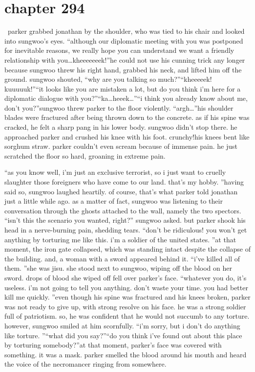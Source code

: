 \section{chapter 294}






 parker grabbed jonathan by the shoulder, who was tied to his chair and looked into sungwoo’s eyes.
“although our diplomatic meeting with you was postponed for inevitable reasons, we really hope you can understand we want a friendly relationship with you…kheeeeeeek!”he could not use his cunning trick any longer because sungwoo threw his right hand, grabbed his neck, and lifted him off the ground.
sungwoo shouted, “why are you talking so much?”“kheeeeek! kuuuuuk!”“it looks like you are mistaken a lot, but do you think i’m here for a diplomatic dialogue with you?”“ka…heeek…”“i think you already know about me, don’t you?”sungwoo threw parker to the floor violently.
“argh…”his shoulder blades were fractured after being thrown down to the concrete.
 as if his spine was cracked, he felt a sharp pang in his lower body.
sungwoo didn’t stop there.
 he approached parker and crushed his knee with his foot.
crunchy!his knees bent like sorghum straw.
 parker couldn’t even scream because of immense pain.
he just scratched the floor so hard, groaning in extreme pain.

“as you know well, i’m just an exclusive terrorist, so i just want to cruelly slaughter those foreigners who have come to our land.
 that’s my hobby.
”having said so, sungwoo laughed heartily.
 of course, that’s what parker told jonathan just a little while ago.
as a matter of fact, sungwoo was listening to their conversation through the ghosts attached to the wall, namely the two spectors.
“isn’t this the scenario you wanted, right?” sungwoo asked.
but parker shook his head in a nerve-burning pain, shedding tears.
“don’t be ridiculous! you won’t get anything by torturing me like this.
 i’m a soldier of the united states.
”at that moment, the iron gate collapsed, which was standing intact despite the collapse of the building.
 and, a woman with a sword appeared behind it.
“i’ve killed all of them.
”she was jisu.
 she stood next to sungwoo, wiping off the blood on her sword.
 drops of blood she wiped off fell over parker’s face.
“whatever you do, it’s useless.
 i’m not going to tell you anything.
 don’t waste your time.
 you had better kill me quickly.
”even though his spine was fractured and his knees broken, parker was not ready to give up, with strong resolve on his face.
 he was a strong soldier full of patriotism.
 so, he was confident that he would not succumb to any torture.
however, sungwoo smiled at him scornfully.
“i’m sorry, but i don’t do anything like torture.
”“what did you say?”“do you think i’ve found out about this place by torturing somebody?”at that moment, parker’s face was covered with something.
 it was a mask.
 parker smelled the blood around his mouth and heard the voice of the necromancer ringing from somewhere.

